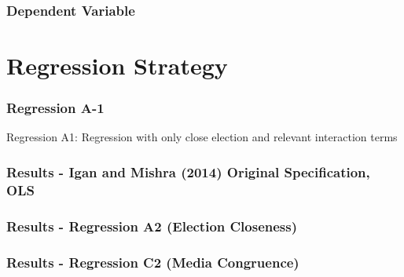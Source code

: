 \documentclass[pdflatex]{beamer}
\providecommand{\texnameMaster}{ProjectKWK}%
\providecommand{\TableDir}{\econtexRoot/Tables}
\begin{document}
\begin{frame}
\frametitle{Dependent Variable}



\end{frame}



\section{Regression Strategy}

\begin{frame}
\frametitle{Regression A-1}

Regression A1: Regression with only close election and relevant interaction terms


\end{frame}


\begin{frame}
\frametitle{Results - Igan and Mishra (2014) Original Specification, OLS}



\end{frame}


\begin{frame}
\frametitle{Results - Regression A2 (Election Closeness)}



\end{frame}


\begin{frame}
\frametitle{Results - Regression C2 (Media Congruence)}



\end{frame}



\def\newblock{\hskip .11em plus .33em minus .07em}

\begin{frame}

\renewcommand{\bibsection}{\subsubsection*{\bibname }}

\tiny 



\end{frame}
\end{document}
